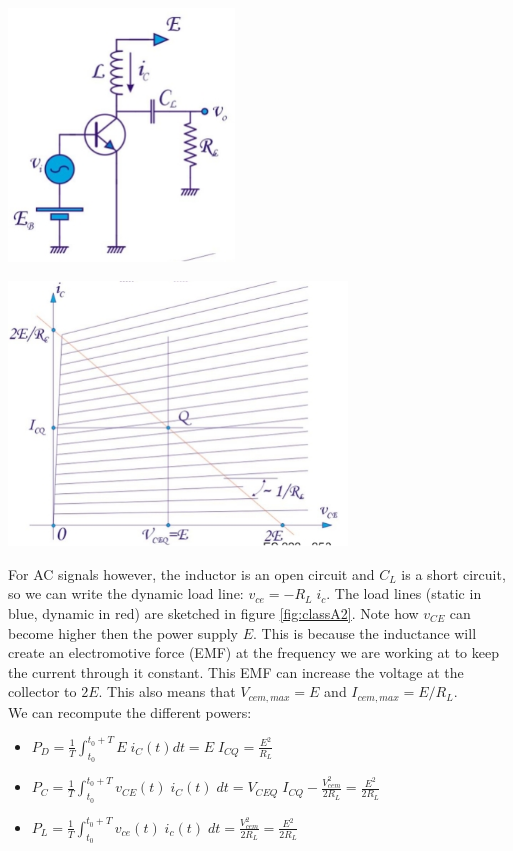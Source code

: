 \begin{minipage}{.5\textwidth}
	\centering
	\includegraphics[width=6cm]{figures/ch09/classA1.jpg}
	\label{fig:classA1}
\end{minipage}%
\begin{minipage}{.5\textwidth}
	\centering
	\includegraphics[width=9cm]{figures/ch09/classA2.jpg}
	\label{fig:classA2}
\end{minipage}
For AC signals however, the inductor is an open circuit and $C_L$ is a short circuit, so we can write the dynamic load line: $v_{ce} = -R_L\; i_c$. The load lines (static in blue, dynamic in red) are sketched in figure \ref{fig:classA2}. Note how $v_{CE}$ can become higher then the power supply $E$. This is because the inductance will create an electromotive force (EMF) at the frequency we are working at to keep the current through it constant. This EMF can increase the voltage at the collector to $2E$. This also means that $V_{cem, max} = E$ and $I_{cem, max} = E/R_L$.\\
We can recompute the different powers:
\begin{itemize}
	\item $P_D = \frac{1}{T} \int_{t_0}^{t_0 + T} E \; i_C(t) dt = E \; I_{CQ} = \frac{E^2}{R_L}$
	\item $P_C = \frac{1}{T} \int_{t_0}^{t_0 + T} v_{CE}(t) \; i_C(t) \; dt = V_{CEQ}\;I_{CQ} - \frac{V_{cem}^2}{2R_L} = \frac{E^2}{2R_L}$
	\item $P_L =  \frac{1}{T} \int_{t_0}^{t_0 + T} v_{ce}(t) \; i_c(t) \; dt = \frac{V_{cem}^2}{2R_L} = \frac{E^2}{2R_L}$
\end{itemize}
